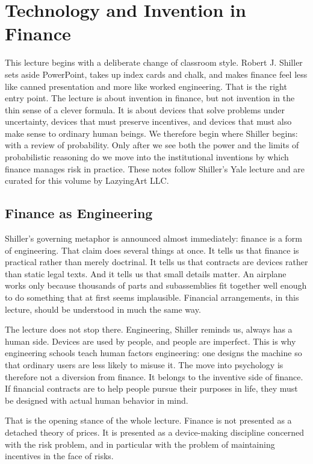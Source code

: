 \chapter{Technology and Invention in Finance}

This lecture begins with a deliberate change of classroom style. Robert J. Shiller sets aside PowerPoint, takes up index cards and chalk, and makes finance feel less like canned presentation and more like worked engineering. That is the right entry point. The lecture is about invention in finance, but not invention in the thin sense of a clever formula. It is about devices that solve problems under uncertainty, devices that must preserve incentives, and devices that must also make sense to ordinary human beings. We therefore begin where Shiller begins: with a review of probability. Only after we see both the power and the limits of probabilistic reasoning do we move into the institutional inventions by which finance manages risk in practice. These notes follow Shiller's Yale lecture and are curated for this volume by LazyingArt LLC.

\section{Finance as Engineering}

Shiller's governing metaphor is announced almost immediately: finance is a form of engineering. That claim does several things at once. It tells us that finance is practical rather than merely doctrinal. It tells us that contracts are devices rather than static legal texts. And it tells us that small details matter. An airplane works only because thousands of parts and subassemblies fit together well enough to do something that at first seems implausible. Financial arrangements, in this lecture, should be understood in much the same way.

The lecture does not stop there. Engineering, Shiller reminds us, always has a human side. Devices are used by people, and people are imperfect. This is why engineering schools teach human factors engineering: one designs the machine so that ordinary users are less likely to misuse it. The move into psychology is therefore not a diversion from finance. It belongs to the inventive side of finance. If financial contracts are to help people pursue their purposes in life, they must be designed with actual human behavior in mind.

That is the opening stance of the whole lecture. Finance is not presented as a detached theory of prices. It is presented as a device-making discipline concerned with the risk problem, and in particular with the problem of maintaining incentives in the face of risks.

